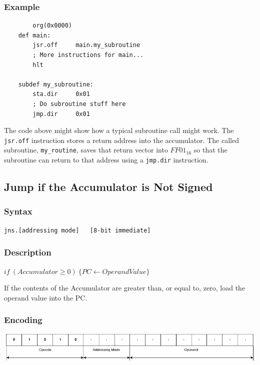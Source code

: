 \subsubsection{Example}
    \begin{verbatim}
        org(0x0000)
    def main:
        jsr.off     main.my_subroutine
        ; More instructions for main...
        hlt

    subdef my_subroutine:
        sta.dir     0x01
        ; Do subroutine stuff here
        jmp.dir     0x01
    \end{verbatim}
    \par The code above might show how a typical subroutine call might work.
    The \texttt{jsr.off} instruction stores a return address into the accumulator.
    The called subroutine, \texttt{my\_routine}, saves that return vector into $FF01_{16}$
    so that the subroutine can return to that address using a \texttt{jmp.dir} instruction.

\pagebreak
\subsection{Jump if the Accumulator is Not Signed}\label{subsec:jns}
    \subsubsection{Syntax}
    \begin{verbatim}jns.[addressing mode]   [8-bit immediate]\end{verbatim}
    \subsubsection{Description}
    $if\ (Accumulator \geq 0)\ \{ PC \leftarrow OperandValue \}$
    \par If the contents of the Accumulator are greater than, or equal to, zero, load the operand value into the PC\@.
    \subsubsection{Encoding}
    \begin{center}
        \includegraphics[scale=0.40]{img/Andromeda-JNS.drawio}
    \end{center}

